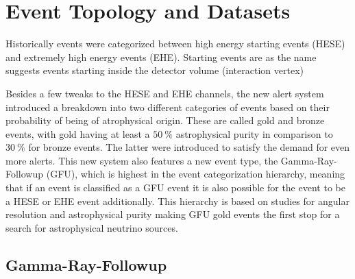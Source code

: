 \chapter{Event Topology and Datasets}

%

Historically events were categorized between high energy starting events (HESE) and extremely high energy events (EHE).
Starting events are as the name suggests events starting inside the detector volume (interaction vertex)

Besides a few tweaks to the HESE and EHE channels, the new alert system introduced a breakdown into two different categories of events based on their probability of being of atrophysical origin.
These are called gold and bronze events, with gold having at least a $\SI{50}{\percent}$ astrophysical purity in comparison to $\SI{30}{\percent}$ for bronze events.
The latter were introduced to satisfy the demand for even more alerts.
This new system also features a new event type, the Gamma-Ray-Followup (GFU), which is highest in the event categorization hierarchy, meaning that if an event is classified as a GFU event it is also possible for the event to be a HESE or EHE event additionally.
This hierarchy is based on studies for angular resolution and astrophysical purity making GFU gold events the first stop for a search for astrophysical neutrino sources.

\cite{Aartsen_2017}

\section{Gamma-Ray-Followup}


